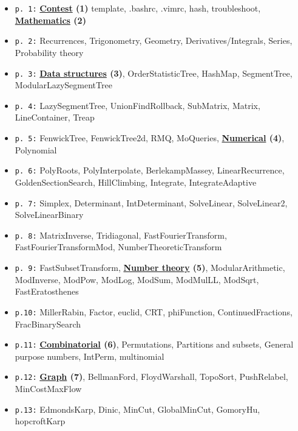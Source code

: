 \documentclass[9pt, a4paper, notitlepage]{extreport}
\begin{document}
	\maketeampage
	\begin{multicols*}{3}
	\thispagestyle{fancy}
	\setcounter{tocdepth}{0}

	\begin{itemize}[noitemsep]
	\raggedright
		\item \texttt{p.\ 1:} \textbf{\underline{Contest} (1)} template, .bashrc, .vimrc, hash, troubleshoot, \textbf{\underline{Mathematics} (2)}
		\item \texttt{p.\ 2:} Recurrences, Trigonometry, Geometry, Derivatives/Integrals, Series, Probability theory
		\item \texttt{p.\ 3:} \textbf{\underline{Data structures} (3)}, OrderStatisticTree, HashMap, SegmentTree, ModularLazySegmentTree
		\item \texttt{p.\ 4:} LazySegmentTree, UnionFindRollback, SubMatrix, Matrix, LineContainer, Treap
		\item \texttt{p.\ 5:} FenwickTree, FenwickTree2d, RMQ, MoQueries, \textbf{\underline{Numerical} (4)}, Polynomial
		\item \texttt{p.\ 6:} PolyRoots, PolyInterpolate, BerlekampMassey, LinearRecurrence, GoldenSectionSearch, HillClimbing, Integrate, IntegrateAdaptive
		\item \texttt{p.\ 7:} Simplex, Determinant, IntDeterminant, SolveLinear, SolveLinear2, SolveLinearBinary
		\item \texttt{p.\ 8:} MatrixInverse, Tridiagonal, FastFourierTransform, FastFourierTransformMod, NumberTheoreticTransform
		\item \texttt{p.\ 9:} FastSubsetTransform, \textbf{\underline{Number theory} (5)}, ModularArithmetic, ModInverse, ModPow, ModLog, ModSum, ModMulLL, ModSqrt, FastEratosthenes
		\item \texttt{p.10:} MillerRabin, Factor, euclid, CRT, phiFunction, ContinuedFractions, FracBinarySearch
		\item \texttt{p.11:} \textbf{\underline{Combinatorial} (6)}, Permutations, Partitions and subsets, General purpose numbers, IntPerm, multinomial
		\item \texttt{p.12:} \textbf{\underline{Graph} (7)}, BellmanFord, FloydWarshall, TopoSort, PushRelabel, MinCostMaxFlow
		\item \texttt{p.13:} EdmondsKarp, Dinic, MinCut, GlobalMinCut, GomoryHu, hopcroftKarp

\end{itemize}
\end{multicols*}
\end{document}
